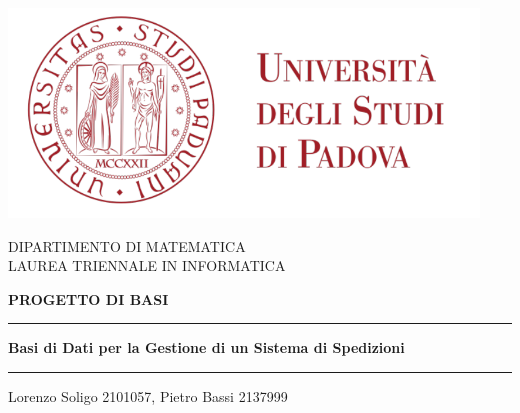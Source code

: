 
\begin{titlepage} 
      \begin{center}
            \thispagestyle{empty}
            \includegraphics[width=12.5cm]{Resources/UNIPD_logo.png}
            \begin{spacing}{2.0}
                \Large{DIPARTIMENTO DI MATEMATICA\\LAUREA TRIENNALE IN INFORMATICA}
            \end{spacing}
            \bigskip
            \begin{spacing}{2.0}

                \large{\textbf{PROGETTO DI BASI}}
                \par\rule{\textwidth}{0.5pt}
                \Huge{\textbf{Basi di Dati per la Gestione di un Sistema di Spedizioni}}
                \par\rule{\textwidth}{0.5pt}
                \bigskip
                \bigskip
                \Large{Lorenzo Soligo 2101057, Pietro Bassi 2137999}
            \end{spacing}
      \end{center}
\end{titlepage}